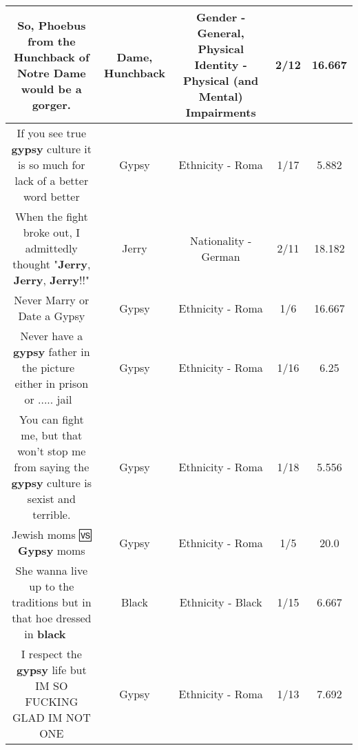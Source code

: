 \documentclass[11pt]{article}
\newlength\mylength
\begin{document}
\begin{center}
\begin{longtable}{|C{.65\mylength}|C{.30\mylength}|C{.12\mylength}|C{.12\mylength}|C{.12\mylength}|}
  \small So, Phoebus from the \textbf{Hunchback} of Notre \textbf{Dame} would be a gorger.\normalsize   & Dame, Hunchback & Gender - General, Physical Identity - Physical (and Mental) Impairments & 2/12 & 16.667 \\  \hline
  \small If you see true \textbf{gypsy} culture it is so much for lack of a better word better\normalsize   & Gypsy & Ethnicity - Roma & 1/17 & 5.882 \\  \hline
  \small When the fight broke out, I admittedly thought "\textbf{Jerry}, \textbf{Jerry}, \textbf{Jerry}!!"\normalsize   & Jerry & Nationality - German & 2/11 & 18.182 \\  \hline
  \small Never Marry or Date a Gypsy\normalsize   & Gypsy & Ethnicity - Roma & 1/6 & 16.667 \\  \hline
  \small Never have a \textbf{gypsy} father in the picture 🤔 either in prison or ..... jail 🤔\normalsize   & Gypsy & Ethnicity - Roma & 1/16 & 6.25 \\  \hline
  \small You can fight me, but that won't stop me from saying the \textbf{gypsy} culture is sexist and terrible.\normalsize   & Gypsy & Ethnicity - Roma & 1/18 & 5.556 \\  \hline
  \small Jewish moms 🆚 \textbf{Gypsy} moms\normalsize   & Gypsy & Ethnicity - Roma & 1/5 & 20.0 \\  \hline
  \small She wanna live up to the traditions but in that hoe dressed in \textbf{black} 🤦🏻‍♀️\normalsize   & Black & Ethnicity - Black & 1/15 & 6.667 \\  \hline
  \small I respect the \textbf{gypsy} life but IM SO FUCKING GLAD IM NOT ONE\normalsize   & Gypsy & Ethnicity - Roma & 1/13 & 7.692 \\  \hline

\end{longtable}
\end{center}
\end{document}
